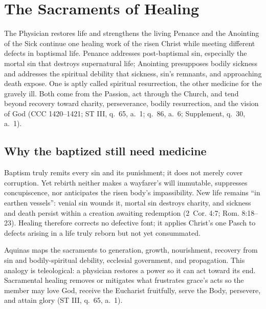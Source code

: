 \clearpage
\section{The Sacraments of Healing}

\begin{massbox}{The Physician restores life and strengthens the living}
Penance and the Anointing of the Sick continue one healing work of the risen Christ while meeting different defects in baptismal life. Penance addresses post-baptismal sin, especially the mortal sin that destroys supernatural life; Anointing presupposes bodily sickness and addresses the spiritual debility that sickness, sin's remnants, and approaching death expose. One is aptly called spiritual resurrection, the other medicine for the gravely ill. Both come from the Passion, act through the Church, and tend beyond recovery toward charity, perseverance, bodily resurrection, and the vision of God (CCC 1420--1421; ST III, q.~65, a.~1; q.~86, a.~6; Supplement, q.~30, a.~1).
\end{massbox}

\subsection{Why the baptized still need medicine}

Baptism truly remits every sin and its punishment; it does not merely cover corruption. Yet rebirth neither makes a wayfarer's will immutable, suppresses concupiscence, nor anticipates the risen body's impassibility. New life remains ``in earthen vessels'': venial sin wounds it, mortal sin destroys charity, and sickness and death persist within a creation awaiting redemption (2~Cor. 4:7; Rom. 8:18--23). Healing therefore corrects no defective font; it applies Christ's one Pasch to defects arising in a life truly reborn but not yet consummated.

Aquinas maps the sacraments to generation, growth, nourishment, recovery from sin and bodily-spiritual debility, ecclesial government, and propagation. This analogy is teleological: a physician restores a power so it can act toward its end. Sacramental healing removes or mitigates what frustrates grace's acts so the member may love God, receive the Eucharist fruitfully, serve the Body, persevere, and attain glory (ST III, q.~65, a.~1).

